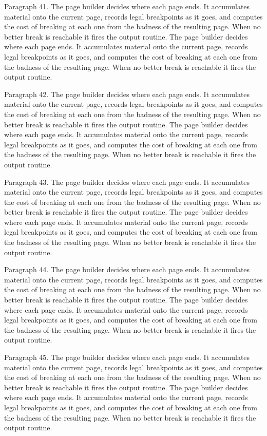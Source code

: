 Paragraph 41. The page builder decides where each page ends. It accumulates material onto the current page, records legal breakpoints as it goes, and computes the cost of breaking at each one from the badness of the resulting page. When no better break is reachable it fires the output routine. The page builder decides where each page ends. It accumulates material onto the current page, records legal breakpoints as it goes, and computes the cost of breaking at each one from the badness of the resulting page. When no better break is reachable it fires the output routine. 

Paragraph 42. The page builder decides where each page ends. It accumulates material onto the current page, records legal breakpoints as it goes, and computes the cost of breaking at each one from the badness of the resulting page. When no better break is reachable it fires the output routine. The page builder decides where each page ends. It accumulates material onto the current page, records legal breakpoints as it goes, and computes the cost of breaking at each one from the badness of the resulting page. When no better break is reachable it fires the output routine. 

Paragraph 43. The page builder decides where each page ends. It accumulates material onto the current page, records legal breakpoints as it goes, and computes the cost of breaking at each one from the badness of the resulting page. When no better break is reachable it fires the output routine. The page builder decides where each page ends. It accumulates material onto the current page, records legal breakpoints as it goes, and computes the cost of breaking at each one from the badness of the resulting page. When no better break is reachable it fires the output routine. 

Paragraph 44. The page builder decides where each page ends. It accumulates material onto the current page, records legal breakpoints as it goes, and computes the cost of breaking at each one from the badness of the resulting page. When no better break is reachable it fires the output routine. The page builder decides where each page ends. It accumulates material onto the current page, records legal breakpoints as it goes, and computes the cost of breaking at each one from the badness of the resulting page. When no better break is reachable it fires the output routine. 

Paragraph 45. The page builder decides where each page ends. It accumulates material onto the current page, records legal breakpoints as it goes, and computes the cost of breaking at each one from the badness of the resulting page. When no better break is reachable it fires the output routine. The page builder decides where each page ends. It accumulates material onto the current page, records legal breakpoints as it goes, and computes the cost of breaking at each one from the badness of the resulting page. When no better break is reachable it fires the output routine. 
\bye
